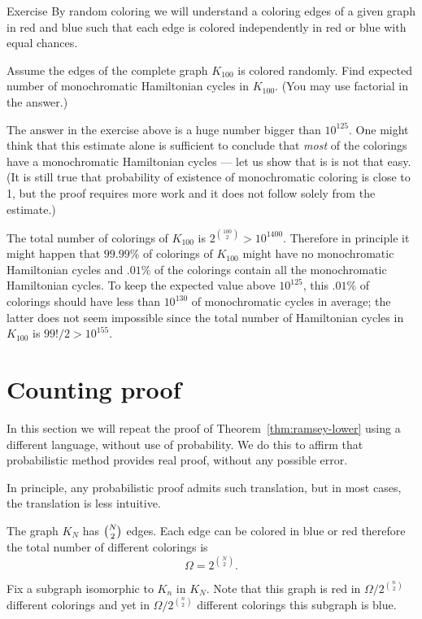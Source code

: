 \begin{thm}{Exercise}
By random coloring we will understand a coloring edges of a given graph in red and blue such that each edge is colored independently in red or blue with equal chances. 

Assume the edges of the complete graph $K_{100}$ is colored randomly. 
Find expected number of monochromatic Hamiltonian cycles in $K_{100}$.
(You may use factorial in the answer.)
\end{thm} %

The answer in the exercise above is a huge number bigger than $10^{125}$.
One might think that this estimate alone is sufficient to conclude that {}\emph{most} of the colorings have a monochromatic Hamiltonian cycles --- let us show that is is not that easy.
(It is still true that probability of existence of monochromatic coloring is close to 1, but the proof requires more work and it does not follow solely from the estimate.)

The total number of colorings of $K_{100}$ is $2^{\binom{100}2}>10^{1400}$.
Therefore in principle it might happen that $99.99\%$ of colorings of $K_{100}$ might have no monochromatic Hamiltonian cycles and $.01\%$ of the colorings contain all the monochromatic Hamiltonian cycles.
To keep the expected value above $10^{125}$,
this $.01\%$ of colorings should have less than $10^{130}$ of monochromatic cycles in average;
the latter does not seem impossible since the total number of Hamiltonian cycles in $K_{100}$ is $99!/2>10^{155}$.

\section*{Counting proof}

In this section we will repeat the proof of Theorem~\ref{thm:ramsey-lower} using a different language, without use of probability.
We do this to affirm that probabilistic method provides real proof, without any possible error.

In principle,  any probabilistic proof admits such translation,
but in most cases, the translation is less intuitive. 

The graph $K_N$ has $\tbinom{N}{2}$ edges.
Each edge can be colored in blue or red therefore the total number of different colorings is \[\Omega=2^{\binom{N}{2}}.\]

Fix a subgraph isomorphic to $K_n$ in $K_N$.
Note that this graph is red in $\Omega/2^{\binom n2}$ different colorings
and yet in $\Omega/2^{\binom n2}$ different colorings this subgraph is blue.

